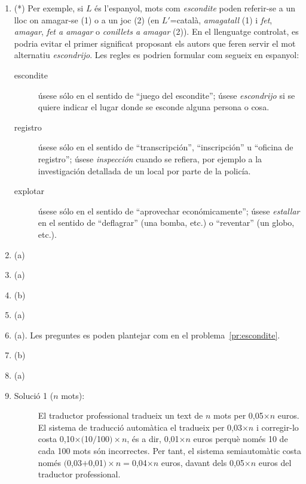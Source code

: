 \begin{enumerate}
\item(*) \label{pr:escondite} Per exemple, si $L$ és l'espanyol, mots com {\em
    escondite} poden referir-se a un lloc on amagar-se (1) o a un
  joc (2) (en $L'$=català, \emph{amagatall} (1) i \emph{fet}, {\em
    amagar}, \emph{fet a amagar} o \emph{conillets a amagar}
  (2)). En el llenguatge controlat, es podria evitar el primer
  significat proposant els autors que feren servir el mot alternatiu {\em
    escondrijo}. Les regles es podrien formular com segueix en
  espanyol:

  {\sl
  \begin{description}
  \item[escondite] úsese sólo en el sentido de ``juego del
    escondite''; úsese \emph{escondrijo} si se quiere indicar el lugar
    donde se esconde alguna persona o cosa.
  \item[registro] úsese sólo en el sentido de ``transcripción'',
    ``inscripción'' u ``oficina de registro''; úsese \emph{inspección}
    cuando se refiera, por ejemplo a la investigación detallada de un
    local por parte de la policía.
  \item[explotar] úsese sólo en el sentido de ``aprovechar
    económicamente''; úsese \emph{estallar} en el sentido de
    ``deflagrar'' (una bomba, etc.) o ``reventar'' (un globo, etc.).
  \end{description}
}

\item (a)
\item (a)
\item (b)
\item (a)
\item (a). Les preguntes es poden plantejar com en el problema~\ref{pr:escondite}.
\item (b)
\item (a) 
\item
  \begin{description} 
  \item [Solució 1 ($n$ mots):] El traductor professional tradueix un
  text de $n$ mots per 0,05$\times n$ euros. El sistema de traducció
  automàtica el tradueix per 0,03$\times n$ i corregir-lo costa
  0,10$\times($10$/$100$)\times n$, és a dir, 0,01$\times n$ euros
  perquè només 10 de cada 100 mots són incorrectes. Per tant, el
  sistema semiautomàtic costa només $($0,03$+$0,01$)\times n =
  $0,04$\times n$ euros, davant dels 0,05$\times n$ euros del
  traductor professional.
 

\end{description}
\end{enumerate}
